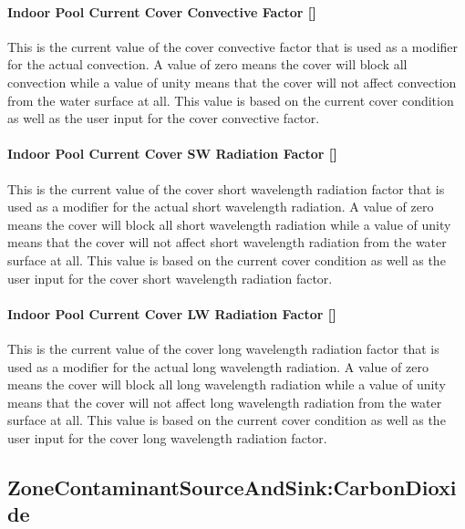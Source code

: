 \paragraph{Indoor Pool Current Cover Convective Factor {[]}}\label{indoor-pool-current-cover-convective-factor}

This is the current value of the cover convective factor that is used as a modifier for the actual convection.  A value of zero means the cover will block all convection while a value of unity means that the cover will not affect convection from the water surface at all.  This value is based on the current cover condition as well as the user input for the cover convective factor.

\paragraph{Indoor Pool Current Cover SW Radiation Factor {[]}}\label{indoor-pool-current-cover-sw-radiation-factor}

This is the current value of the cover short wavelength radiation factor that is used as a modifier for the actual short wavelength radiation.  A value of zero means the cover will block all short wavelength radiation while a value of unity means that the cover will not affect short wavelength radiation from the water surface at all.  This value is based on the current cover condition as well as the user input for the cover short wavelength radiation factor.

\paragraph{Indoor Pool Current Cover LW Radiation Factor {[]}}\label{indoor-pool-current-cover-lw-radiation-factor}

This is the current value of the cover long wavelength radiation factor that is used as a modifier for the actual long wavelength radiation.  A value of zero means the cover will block all long wavelength radiation while a value of unity means that the cover will not affect long wavelength radiation from the water surface at all.  This value is based on the current cover condition as well as the user input for the cover long wavelength radiation factor.


\subsection{ZoneContaminantSourceAndSink:CarbonDioxide}\label{zonecontaminantsourceandsinkcarbondioxide}

